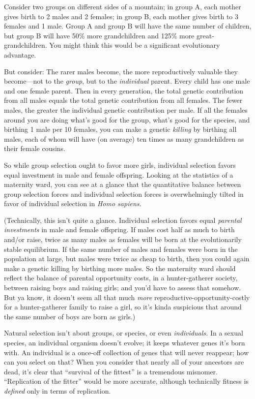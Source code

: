 {
 Consider two groups on different sides of a mountain; in group A,
each mother gives birth to 2 males and 2 females; in group B, each
mother gives birth to 3 females and 1 male. Group A and group B will
have the same number of children, but group B will have 50\% more
grandchildren and 125\% more great-grandchildren. You might think this
would be a significant evolutionary advantage.}

{
 But consider: The rarer males become, the more reproductively
valuable they become---not to the \textit{group}, but to the
\textit{individual} parent. Every child has one male and one female
parent. Then in every generation, the total genetic contribution from
all males equals the total genetic contribution from all females. The
fewer males, the greater the individual genetic contribution per male.
If all the females around you are doing what's good for
the group, what's good for the species, and birthing 1
male per 10 females, you can make a genetic \textit{killing} by
birthing all males, each of whom will have (on average) ten times as
many grandchildren as their female cousins.}

{
 So while group selection ought to favor more girls, individual
selection favors equal investment in male and female offspring. Looking
at the statistics of a maternity ward, you can see at a glance that the
quantitative balance between group selection forces and individual
selection forces is overwhelmingly tilted in favor of individual
selection in \textit{Homo sapiens.}}

{
 (Technically, this isn't quite a glance.
Individual selection favors equal \textit{parental investments} in male
and female offspring. If males cost half as much to birth and/or raise,
twice as many males as females will be born at the evolutionarily
stable equilibrium. If the same number of males and females were born
in the population at large, but males were twice as cheap to birth,
then you could again make a genetic killing by birthing more males. So
the maternity ward should reflect the balance of parental opportunity
costs, in a hunter-gatherer society, between raising boys and raising
girls; and you'd have to assess that somehow. But ya
know, it doesn't seem all that much \textit{more}
reproductive-opportunity-costly for a hunter-gatherer family to raise a
girl, so it's kinda suspicious that around the same
number of boys are born as girls.)}

{
 Natural selection isn't about groups, or species,
or even \textit{individuals.} In a sexual species, an individual
organism doesn't evolve; it keeps whatever genes
it's born with. An individual is a once-off collection
of genes that will never reappear; how can you select on that? When you
consider that nearly all of your ancestors are dead,
it's clear that ``survival of the
fittest'' is a tremendous misnomer.
``Replication of the fitter'' would
be more accurate, although technically fitness is \textit{defined} only
in terms of replication.}

